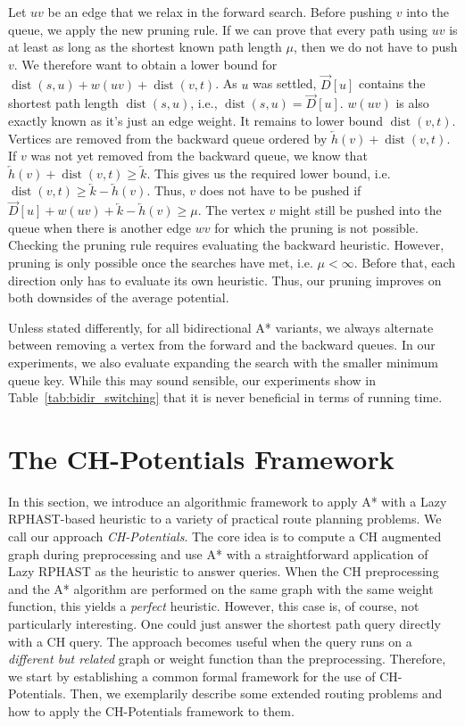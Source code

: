 \documentclass[manuscript,review]{acmart}
\newcommand*{\dist}{\operatorname{dist}}
\begin{document}
Let $uv$ be an edge that we relax in the forward search.
Before pushing $v$ into the queue, we apply the new pruning rule.
If we can prove that every path using $uv$ is at least as long as the shortest known path length $\mu$, then we do not have to push $v$.
We therefore want to obtain a lower bound for $\dist(s,u)+w(uv)+\dist(v,t)$.
As $u$ was settled, $\overrightarrow{D}[u]$ contains the shortest path length $\dist(s,u)$, i.e., $\dist(s,u)=\overrightarrow{D}[u]$.
$w(uv)$ is also exactly known as it's just an edge weight.
It remains to lower bound $\dist(v,t)$.
Vertices are removed from the backward queue ordered by $\overleftarrow{h}(v) + \dist(v,t)$.
If $v$ was not yet removed from the backward queue, we know that $\overleftarrow{h}(v) + \dist(v,t) \geq \overleftarrow{k}$.
This gives us the required lower bound, i.e. $\dist(v,t) \geq \overleftarrow{k}-\overleftarrow{h}(v)$.
Thus, $v$ does not have to be pushed if $\overrightarrow{D}[u]+w(uv)+\overleftarrow{k}-\overleftarrow{h}(v)\ge \mu$.
The vertex $v$ might still be pushed into the queue when there is another edge $wv$ for which the pruning is not possible.
Checking the pruning rule requires evaluating the backward heuristic.
However, pruning is only possible once the searches have met, i.e. $\mu < \infty$.
Before that, each direction only has to evaluate its own heuristic.
Thus, our pruning improves on both downsides of the average potential.

Unless stated differently, for all bidirectional A* variants, we always alternate between removing a vertex from the forward and the backward queues.
In our experiments, we also evaluate expanding the search with the smaller minimum queue key.
While this may sound sensible, our experiments show in Table~\ref{tab:bidir_switching} that it is never beneficial in terms of running time.

\section{The CH-Potentials Framework}\label{sec:framework}

In this section, we introduce an algorithmic framework to apply A* with a Lazy RPHAST-based heuristic to a variety of practical route planning problems.
We call our approach \emph{CH-Potentials}.
The core idea is to compute a CH augmented graph during preprocessing and use A* with a straightforward application of Lazy RPHAST as the heuristic to answer queries.
When the CH preprocessing and the A* algorithm are performed on the same graph with the same weight function, this yields a \emph{perfect} heuristic.
However, this case is, of course, not particularly interesting.
One could just answer the shortest path query directly with a CH query.
The approach becomes useful when the query runs on a \emph{different but related} graph or weight function than the preprocessing.
Therefore, we start by establishing a common formal framework for the use of CH-Potentials.
Then, we exemplarily describe some extended routing problems and how to apply the CH-Potentials framework to them.
\end{document}
